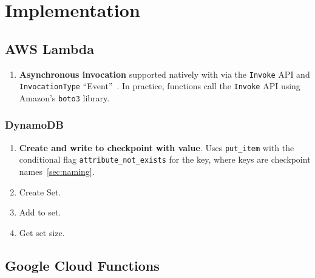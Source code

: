 \section{Implementation}\label{sec:impl}

\subsection{AWS Lambda}

\begin{enumerate}
  \item \textbf{Asynchronous invocation} supported natively with via the \texttt{Invoke} API and \texttt{InvocationType} ``Event''~\cite{aws-asyn-invoke}. In practice, functions call the \texttt{Invoke} API using Amazon's \texttt{boto3} library.
\end{enumerate}

\subsubsection{DynamoDB}

\begin{enumerate}
  \item \textbf{Create and write to checkpoint with value}. Uses \texttt{put\_item} with the conditional flag \texttt{attribute\_not\_exists} for the key, where keys are checkpoint names~\ref{sec:naming}. 
  \item Create Set.
  \item Add to set.
  \item Get set size.
\end{enumerate}



\subsection{Google Cloud Functions}

